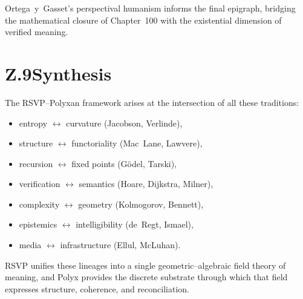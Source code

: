 Ortega~y~Gasset’s perspectival humanism informs the final epigraph,
bridging the mathematical closure of Chapter~100 with the existential dimension
of verified meaning.

\section*{Z.9\quad Synthesis}
The RSVP--Polyxan framework arises at the intersection of all these traditions:
\begin{itemize}
    \item entropy $\leftrightarrow$ curvature (Jacobson, Verlinde),
    \item structure $\leftrightarrow$ functoriality (Mac~Lane, Lawvere),
    \item recursion $\leftrightarrow$ fixed points (Gödel, Tarski),
    \item verification $\leftrightarrow$ semantics (Hoare, Dijkstra, Milner),
    \item complexity $\leftrightarrow$ geometry (Kolmogorov, Bennett),
    \item epistemics $\leftrightarrow$ intelligibility (de~Regt, Ismael),
    \item media $\leftrightarrow$ infrastructure (Ellul, McLuhan).
\end{itemize}

RSVP unifies these lineages into a single geometric--algebraic field theory of
meaning, and Polyx provides the discrete substrate through which that field
expresses structure, coherence, and reconciliation.


